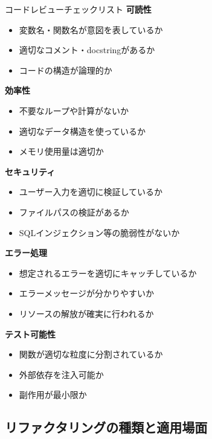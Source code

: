 \begin{itembox}[l]{コードレビューチェックリスト}
\textbf{可読性}
\begin{itemize}
\item 変数名・関数名が意図を表しているか
\item 適切なコメント・docstringがあるか
\item コードの構造が論理的か
\end{itemize}

\textbf{効率性}
\begin{itemize}
\item 不要なループや計算がないか
\item 適切なデータ構造を使っているか
\item メモリ使用量は適切か
\end{itemize}

\textbf{セキュリティ}
\begin{itemize}
\item ユーザー入力を適切に検証しているか
\item ファイルパスの検証があるか
\item SQLインジェクション等の脆弱性がないか
\end{itemize}

\textbf{エラー処理}
\begin{itemize}
\item 想定されるエラーを適切にキャッチしているか
\item エラーメッセージが分かりやすいか
\item リソースの解放が確実に行われるか
\end{itemize}

\textbf{テスト可能性}
\begin{itemize}
\item 関数が適切な粒度に分割されているか
\item 外部依存を注入可能か
\item 副作用が最小限か
\end{itemize}
\end{itembox}

\subsection{リファクタリングの種類と適用場面}

